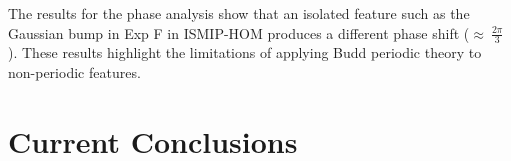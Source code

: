 The results for the phase analysis show that an isolated feature such as the Gaussian bump in Exp F in ISMIP-HOM produces a different phase shift ($\approx~\frac{2\pi}{3}$). These results highlight the limitations of applying Budd periodic theory to non-periodic features.

\section{Current Conclusions}


